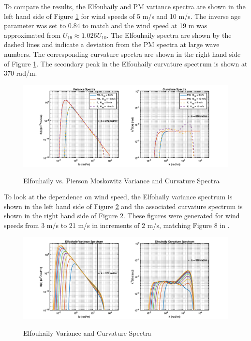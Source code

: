 \renewcommand{\baselinestretch}{2} \small\normalsize
To compare the results, the Elfouhaily and PM variance spectra are shown in the left hand side of Figure \ref{os_fig:2} for wind speeds of 5 m/s and 10 m/s. The inverse age parameter was set to 0.84 to match and the wind speed at 19 m was approximated from $U_{19} \approx 1.026 U_{10}$. The Elfouhaily spectra are shown by the dashed lines and indicate a deviation from the PM spectra at large wave numbers. The corresponding curvature spectra are shown in the right hand side of Figure \ref{os_fig:2}. The secondary peak in the Elfouhaily curvature spectrum is shown at 370 rad/m.
\begin{figure}[H]
  \begin{center}
\includegraphics[width=6in]{../media/Ocean_Surface/elf_vs_PM_variance_curvature_spectrum.png}
  \end{center}
  \renewcommand{\baselinestretch}{1} \small\normalsize
  \begin{quote}
    \caption[Elfouhaily vs. Pierson Moskowitz Variance and Curvature Spectra]{Elfouhaily vs. Pierson Moskowitz Variance and Curvature Spectra\label{os_fig:2}}
  \end{quote}
\end{figure}
\renewcommand{\baselinestretch}{2} \small\normalsize
To look at the dependence on wind speed, the Elfohaily variance spectrum is shown in the left hand side of Figure \ref{os_fig:3} and the associated curvature spectrum is shown in the right hand side of Figure \ref{os_fig:3}. These figures were generated for wind speeds from 3 m/s to 21 m/s in increments of 2 m/s, matching Figure 8 in \cite{elfouhaily}.
\begin{figure}[H]
  \begin{center}
\includegraphics[width=6in]{../media/Ocean_Surface/elf_variance_curvature_spectrum.png}
  \end{center}
  \renewcommand{\baselinestretch}{1} \small\normalsize
  \begin{quote}
    \caption[Elfouhaily Variance and Curvature Spectra]{Elfouhaily Variance and Curvature Spectra\label{os_fig:3}}
  \end{quote}
\end{figure}
